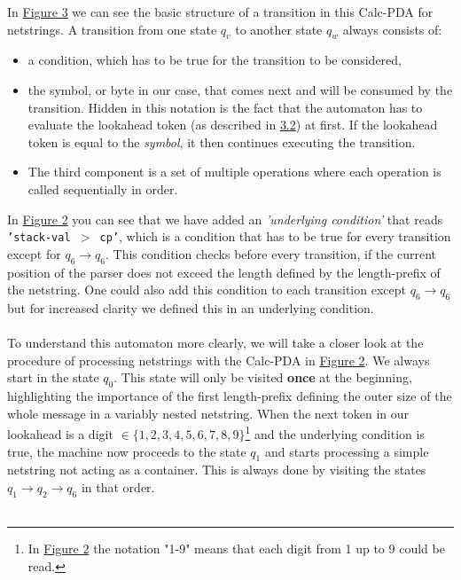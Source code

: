 In \hyperref[fig:fig-3-transition-netstring-Calc-pda-1]{Figure 3} we can see the basic structure of a transition in this Calc-PDA for netstrings. A transition from one state $q_v$ to another state $q_w$ always consists of:
\begin{itemize}
    \item a condition, which has to be true for the transition to be considered,
    \item the symbol, or byte in our case, that comes next and will be consumed by the transition. Hidden in this notation is the fact that the automaton has to evaluate the lookahead token (as described in \hyperref[3.2]{3.2}) at first. If the lookahead token is equal to the \textit{symbol}, it then continues executing the transition.
    \item The third component is a set of multiple operations where each operation is called sequentially in order.
\end{itemize}
In \hyperref[fig:fig-2-netstring-Calc-pda-1]{Figure 2} you can see that we have added an \textit{'underlying condition'} that reads \texttt{'stack-val $>$ cp'}, which is a condition that has to be true for every transition except for $q_6 \rightarrow q_6$. This condition checks before every transition, if the current position of the parser does not exceed the length defined by the length-prefix of the netstring. One could also add this condition to each transition except $q_6 \rightarrow q_6$ but for increased clarity we defined this in an underlying condition. \\\\
To understand this automaton more clearly, we will take a closer look at the procedure of processing netstrings with the Calc-PDA in \hyperref[fig:fig-2-netstring-Calc-pda-1]{Figure 2}.
We always start in the state $q_0$. This state will only be visited \textbf{once} at the beginning, highlighting the importance of the first length-prefix defining the outer size of the whole message in a variably nested netstring. When the next token in our lookahead is a digit $\in \{1,2,3,4,5,6,7,8,9\}$\footnote{In \hyperref[fig:fig-2-netstring-Calc-pda-1]{Figure 2} the notation "1-9" means that each digit from 1 up to 9 could be read. } and the underlying condition is true, the machine now proceeds to the state $q_1$ and starts processing a simple netstring not acting as a container. This is always done by visiting the states $q_1 \rightarrow q_2 \rightarrow q_6$ in that order.\\\\
